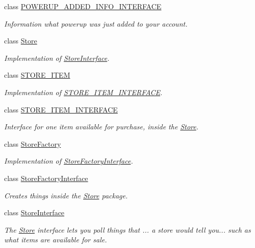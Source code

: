 \begin{DoxyCompactItemize}
class \hyperlink{classAsteroids_1_1Domain_1_1Store_1_1POWERUP__ADDED__INFO__INTERFACE}{P\+O\+W\+E\+R\+U\+P\+\_\+\+A\+D\+D\+E\+D\+\_\+\+I\+N\+F\+O\+\_\+\+I\+N\+T\+E\+R\+F\+A\+CE}
\begin{DoxyCompactList}\small\item\em Information what powerup was just added to your account. \end{DoxyCompactList}\item 
class \hyperlink{classAsteroids_1_1Domain_1_1Store_1_1Store}{Store}
\begin{DoxyCompactList}\small\item\em Implementation of \hyperlink{classAsteroids_1_1Domain_1_1Store_1_1StoreInterface}{Store\+Interface}. \end{DoxyCompactList}\item 
class \hyperlink{classAsteroids_1_1Domain_1_1Store_1_1STORE__ITEM}{S\+T\+O\+R\+E\+\_\+\+I\+T\+EM}
\begin{DoxyCompactList}\small\item\em Implementation of \hyperlink{classAsteroids_1_1Domain_1_1Store_1_1STORE__ITEM__INTERFACE}{S\+T\+O\+R\+E\+\_\+\+I\+T\+E\+M\+\_\+\+I\+N\+T\+E\+R\+F\+A\+CE}. \end{DoxyCompactList}\item 
class \hyperlink{classAsteroids_1_1Domain_1_1Store_1_1STORE__ITEM__INTERFACE}{S\+T\+O\+R\+E\+\_\+\+I\+T\+E\+M\+\_\+\+I\+N\+T\+E\+R\+F\+A\+CE}
\begin{DoxyCompactList}\small\item\em Interface for one item available for purchase, inside the \hyperlink{classAsteroids_1_1Domain_1_1Store_1_1Store}{Store}. \end{DoxyCompactList}\item 
class \hyperlink{classAsteroids_1_1Domain_1_1Store_1_1StoreFactory}{Store\+Factory}
\begin{DoxyCompactList}\small\item\em Implementation of \hyperlink{classAsteroids_1_1Domain_1_1Store_1_1StoreFactoryInterface}{Store\+Factory\+Interface}. \end{DoxyCompactList}\item 
class \hyperlink{classAsteroids_1_1Domain_1_1Store_1_1StoreFactoryInterface}{Store\+Factory\+Interface}
\begin{DoxyCompactList}\small\item\em Creates things inside the \hyperlink{classAsteroids_1_1Domain_1_1Store_1_1Store}{Store} package. \end{DoxyCompactList}\item 
class \hyperlink{classAsteroids_1_1Domain_1_1Store_1_1StoreInterface}{Store\+Interface}
\begin{DoxyCompactList}\small\item\em The \hyperlink{classAsteroids_1_1Domain_1_1Store_1_1Store}{Store} interface lets you poll things that ... a store would tell you... such as what items are available for sale. \end{DoxyCompactList}\end{DoxyCompactItemize}


